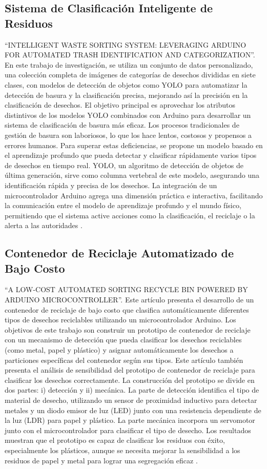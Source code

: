 \subsection{Sistema de Clasificación Inteligente de Residuos}
“INTELLIGENT WASTE SORTING SYSTEM: LEVERAGING ARDUINO FOR AUTOMATED TRASH IDENTIFICATION AND CATEGORIZATION”. En este trabajo de investigación, se utiliza un conjunto de datos personalizado, una colección completa de imágenes de categorías de desechos divididas en siete clases, con modelos de detección de objetos como YOLO para automatizar la detección de basura y la clasificación precisa, mejorando así la precisión en la clasificación de desechos. El objetivo principal es aprovechar los atributos distintivos de los modelos YOLO combinados con Arduino para desarrollar un sistema de clasificación de basura más eficaz. Los procesos tradicionales de gestión de basura son laboriosos, lo que los hace lentos, costosos y propensos a errores humanos. Para superar estas deficiencias, se propone un modelo basado en el aprendizaje profundo que pueda detectar y clasificar rápidamente varios tipos de desechos en tiempo real. YOLO, un algoritmo de detección de objetos de última generación, sirve como columna vertebral de este modelo, asegurando una identificación rápida y precisa de los desechos. La integración de un microcontrolador Arduino agrega una dimensión práctica e interactiva, facilitando la comunicación entre el modelo de aprendizaje profundo y el mundo físico, permitiendo que el sistema active acciones como la clasificación, el reciclaje o la alerta a las autoridades \cite{ali}.

\subsection{Contenedor de Reciclaje Automatizado de Bajo Costo}
“A LOW-COST AUTOMATED SORTING RECYCLE BIN POWERED BY ARDUINO MICROCONTROLLER”. Este artículo presenta el desarrollo de un contenedor de reciclaje de bajo costo que clasifica automáticamente diferentes tipos de desechos reciclables utilizando un microcontrolador Arduino. Los objetivos de este trabajo son construir un prototipo de contenedor de reciclaje con un mecanismo de detección que pueda clasificar los desechos reciclables (como metal, papel y plástico) y asignar automáticamente los desechos a particiones específicas del contenedor según sus tipos. Este artículo también presenta el análisis de sensibilidad del prototipo de contenedor de reciclaje para clasificar los desechos correctamente. La construcción del prototipo se divide en dos partes: i) detección y ii) mecánica. La parte de detección identifica el tipo de material de desecho, utilizando un sensor de proximidad inductivo para detectar metales y un diodo emisor de luz (LED) junto con una resistencia dependiente de la luz (LDR) para papel y plástico. La parte mecánica incorpora un servomotor junto con el microcontrolador para clasificar el tipo de desecho. Los resultados muestran que el prototipo es capaz de clasificar los residuos con éxito, especialmente los plásticos, aunque se necesita mejorar la sensibilidad a los residuos de papel y metal para lograr una segregación eficaz \cite{hassan}.
